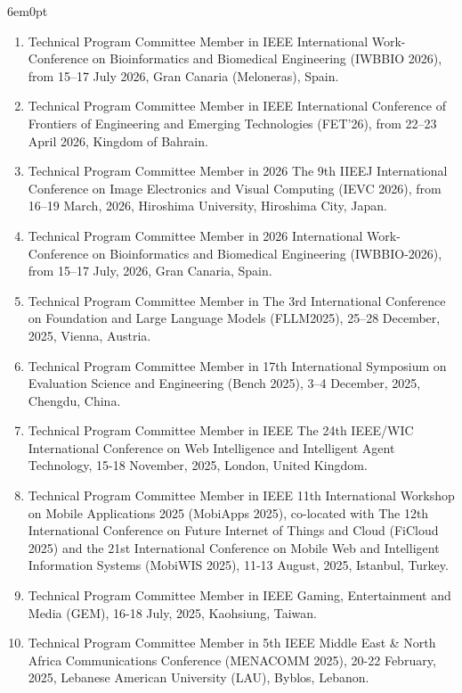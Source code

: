 \documentclass[11pt,a4paper]{moderncv}
\begin{document}
\begin{adjustwidth}{6em}{0pt}
\begin{enumerate}
		\item Technical Program Committee Member in IEEE International Work-Conference on Bioinformatics and Biomedical Engineering (IWBBIO 2026), from 15–17 July 2026, Gran Canaria (Meloneras), Spain.
		
		\item Technical Program Committee Member in IEEE International Conference of Frontiers of Engineering and Emerging Technologies (FET’26), from 22–23 April 2026, Kingdom of Bahrain.
		
		\item Technical Program Committee Member in 2026 The 9th IIEEJ International Conference on Image Electronics and Visual Computing (IEVC 2026), from 16–19 March, 2026, Hiroshima University, Hiroshima City, Japan.
		
		\item Technical Program Committee Member in 2026 International Work-Conference on Bioinformatics and Biomedical Engineering (IWBBIO-2026), from 15–17 July, 2026, Gran Canaria, Spain.
		
		\item Technical Program Committee Member in The 3rd International Conference on Foundation and Large Language Models (FLLM2025), 25–28 December, 2025, Vienna, Austria.
		
		\item Technical Program Committee Member in 17th International Symposium on Evaluation Science and Engineering (Bench 2025), 3–4 December, 2025, Chengdu, China.
		
		\item Technical Program Committee Member in IEEE The 24th IEEE/WIC International Conference on Web Intelligence and Intelligent Agent Technology, 15-18 November, 2025, London, United Kingdom.
		
		\item Technical Program Committee Member in IEEE 11th International Workshop on Mobile Applications 2025 (MobiApps 2025), co-located with The 12th International Conference on Future Internet of Things and Cloud (FiCloud 2025) and the 21st International Conference on Mobile Web and Intelligent Information Systems (MobiWIS 2025), 11-13 August, 2025, Istanbul, Turkey.
		
		\item Technical Program Committee Member in IEEE Gaming, Entertainment and Media (GEM), 16-18 July, 2025, Kaohsiung, Taiwan.
		
		\item Technical Program Committee Member in 5th IEEE Middle East \& North Africa Communications Conference (MENACOMM 2025), 20-22 February, 2025, Lebanese American University (LAU), Byblos, Lebanon.
		

\end{enumerate}
\end{adjustwidth}
\end{document}
